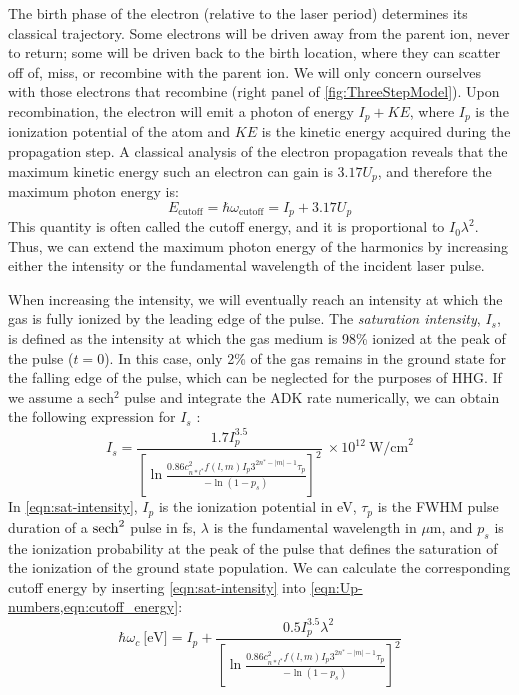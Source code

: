 The birth phase of the electron (relative to the laser period) determines its classical trajectory. Some electrons will be driven away from the parent ion, never to return; some will be driven back to the birth location, where they can scatter off of, miss, or recombine with the parent ion. We will only concern ourselves with those electrons that recombine (right panel of \cref{fig:ThreeStepModel}). Upon recombination, the electron will emit a photon of energy $I_p + KE$, where $I_p$ is the ionization potential of the atom and $KE$ is the kinetic energy acquired during the propagation step. A classical analysis of the electron propagation reveals that the maximum kinetic energy such an electron can gain is $3.17 U_p$, and therefore the maximum photon energy is: 
\begin{equation}
E_{\textrm{cutoff}} = \hbar \omega_{\textrm{cutoff}} = I_p + 3.17 U_p
\label{eqn:cutoff_energy}
\end{equation}
This quantity is often called the cutoff energy, and it is proportional to $I_0 \lambda^2$. Thus, we can extend the maximum photon energy of the harmonics by increasing either the intensity or the fundamental wavelength of the incident laser pulse.

When increasing the intensity, we will eventually reach an intensity at which the gas is fully ionized by the leading edge of the pulse. The \textit{saturation intensity}, $I_s$, is defined as the intensity at which the gas medium is 98\% ionized at the peak of the pulse ($t=0$). In this case, only 2\% of the gas remains in the ground state for the falling edge of the pulse, which can be neglected for the purposes of HHG. If we assume a sech$^2$ pulse and integrate the ADK rate numerically, we can obtain the following expression for $I_{s}$ \cite{changFundamentalsAttosecondOptics2011}:
\begin{equation}
I_s = \frac{1.7 I_p^{3.5}}{\left[ \ln \frac{0.86 c_{n*l^*}^2 f(l,m) I_p 3^{2n^*-|m|-1} \tau_p}{- \ln(1-p_s)}\right]^2} \ \times 10^{12} \ \textrm{W/cm}^2
\label{eqn:sat-intensity}
\end{equation}
In \cref{eqn:sat-intensity}, $I_p$ is the ionization potential in eV, $\tau_p$ is the FWHM pulse duration of a $\sech^2$ pulse in fs, $\lambda$ is the fundamental wavelength in $\mu$m, and $p_s$ is the ionization probability at the peak of the pulse that defines the saturation of the ionization of the ground state population. We can calculate the corresponding cutoff energy by inserting \cref{eqn:sat-intensity} into \cref{eqn:Up-numbers,eqn:cutoff_energy}:
\begin{equation}
\hbar \omega_c \ \textrm{[eV]} = I_p + \frac{0.5 I_p^{3.5} \lambda^2}{\left[ \ln \frac{0.86 c_{n*l^*}^2 f(l,m) I_p 3^{2n^*-|m|-1} \tau_p}{- \ln(1-p_s)}\right]^2}
\label{eqn:sat-int-cutoff}
\end{equation}

